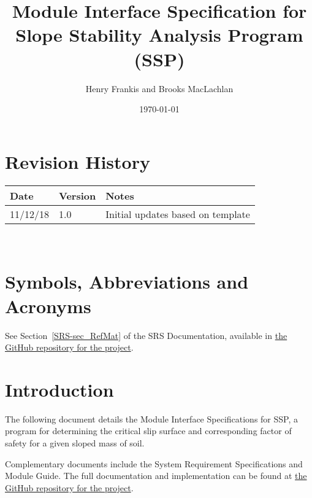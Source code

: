 \documentclass[12pt, titlepage]{article}
\newcommand{\progname}{SSP}
\begin{document}
\title{Module Interface Specification for Slope Stability Analysis Program 
(\progname)} 
\author{Henry Frankis and Brooks MacLachlan}
\date{\today}
	
\maketitle


\section{Revision History}

\begin{tabularx}{\textwidth}{p{3cm}p{2cm}X}
	\toprule {\bf Date} & {\bf Version} & {\bf Notes}\\
	\midrule
	11/12/18 & 1.0 & Initial updates based on template\\
	\bottomrule
\end{tabularx}

~\newpage

\section{Symbols, Abbreviations and Acronyms}

See Section~\ref{SRS-sec_RefMat} of the SRS Documentation, available in
\href{https://github.com/smiths/caseStudies/blob/master/CaseStudies/ssp/docs/SRS/SRS.pdf}
{the GitHub repository for the project}.

\newpage

\tableofcontents

\newpage


\section{Introduction}

The following document details the Module Interface Specifications for
\progname, a program for determining the critical slip surface and 
corresponding factor of safety for a given sloped mass of soil.

Complementary documents include the System Requirement Specifications
and Module Guide.  The full documentation and implementation can be
found at 
\href{https://github.com/smiths/caseStudies/tree/master/CaseStudies/ssp}
{the GitHub repository for the project}.
\end{document}
